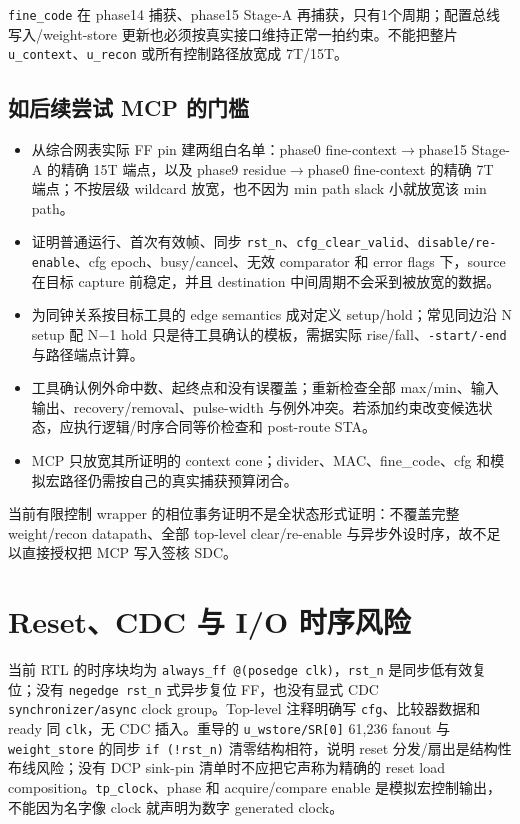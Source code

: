 \documentclass[UTF8,fontset=fandol,10pt,a4paper,openany]{ctexrep}
\newcommand{\code}[1]{\nolinkurl{#1}}
\begin{document}
\code{fine_code} 在 phase14 捕获、phase15 Stage-A 再捕获，只有1个周期；配置总线写入/weight-store 更新也必须按真实接口维持正常一拍约束。不能把整片 \code{u_context}、\code{u_recon} 或所有控制路径放宽成 7T/15T。


\subsection{如后续尝试 MCP 的门槛}


\begin{itemize}
\item 从综合网表实际 FF pin 建两组白名单：phase0 fine-context\ensuremath{\rightarrow}phase15 Stage-A 的精确 15T 端点，以及 phase9 residue\ensuremath{\rightarrow}phase0 fine-context 的精确 7T 端点；不按层级 wildcard 放宽，也不因为 min path slack 小就放宽该 min path。
\item 证明普通运行、首次有效帧、同步 \code{rst_n}、\code{cfg_clear_valid}、\code{disable/re-enable}、cfg epoch、busy/cancel、无效 comparator 和 error flags 下，source 在目标 capture 前稳定，并且 destination 中间周期不会采到被放宽的数据。
\item 为同钟关系按目标工具的 edge semantics 成对定义 setup/hold；常见同边沿 N setup 配 N\ensuremath{-}1 hold 只是待工具确认的模板，需据实际 rise/fall、\code{-start/-end} 与路径端点计算。
\item 工具确认例外命中数、起终点和没有误覆盖；重新检查全部 max/min、输入输出、recovery/removal、pulse-width 与例外冲突。若添加约束改变候选状态，应执行逻辑/时序合同等价检查和 post-route STA。
\item MCP 只放宽其所证明的 context cone；divider、MAC、fine\_code、cfg 和模拟宏路径仍需按自己的真实捕获预算闭合。
\end{itemize}


当前有限控制 wrapper 的相位事务证明不是全状态形式证明：不覆盖完整 weight/recon datapath、全部 top-level clear/re-enable 与异步外设时序，故不足以直接授权把 MCP 写入签核 SDC。


\section{Reset、CDC 与 I/O 时序风险}


当前 RTL 的时序块均为 \code{always_ff @(posedge clk)}，\code{rst_n} 是同步低有效复位；没有 \code{negedge rst_n} 式异步复位 FF，也没有显式 CDC \code{synchronizer/async} clock group。Top-level 注释明确写 \code{cfg}、比较器数据和 ready 同 \code{clk}，无 CDC 插入。重导的 \code{u_wstore/SR[0]} 61,236 fanout 与 \code{weight_store} 的同步 \code{if (!rst_n)} 清零结构相符，说明 reset 分发/扇出是结构性布线风险；没有 DCP sink-pin 清单时不应把它声称为精确的 reset load composition。\code{tp_clock}、phase 和 acquire/compare enable 是模拟宏控制输出，不能因为名字像 clock 就声明为数字 generated clock。
\end{document}
